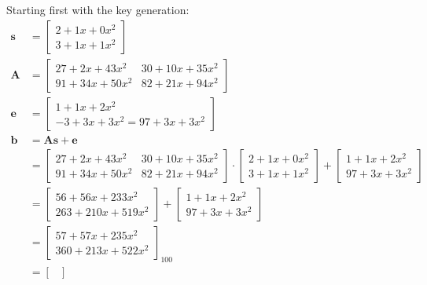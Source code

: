 Starting first with the key generation:
\begin{align*}
  \textbf{s} & = \begin{bmatrix}2+ 1x + 0x^2 \\ 3+1x+1x^2 \end{bmatrix}                                 \\
  \textbf{A} & = \begin{bmatrix}27+2x+43x^2 & 30+10x+35x^2 \\ 91+34x+50x^2 & 82+21x+94x^2 \end{bmatrix} \\
  \textbf{e} & = \begin{bmatrix}1+1x+2x^2 \\ -3+3x+3x^2=97+3x+3x^2 \end{bmatrix}                        \\
  \textbf{b} & = \textbf{A}\textbf{s}+\textbf{e}                                                        \\
             & = \begin{bmatrix}27+2x+43x^2 & 30+10x+35x^2 \\ 91+34x+50x^2 & 82+21x+94x^2 \end{bmatrix}
  \cdot
  \begin{bmatrix}2+ 1x + 0x^2 \\ 3+1x+1x^2 \end{bmatrix}
  +
  \begin{bmatrix}1+1x+2x^2 \\ 97+3x+3x^2 \end{bmatrix}
  \\
             & = 
  \begin{bmatrix}
    56+56x+233x^2 \\
    263+210x+519x^2
  \end{bmatrix}
  + 
  \begin{bmatrix}1+1x+2x^2 \\ 97+3x+3x^2 \end{bmatrix}                                                  \\
             & =   \begin{bmatrix}
                     57+57x+235x^2 \\
                     360+213x+522x^2
                   \end{bmatrix}_{100}                                                                  \\
             & = \begin{bmatrix}

\end{bmatrix}
\end{align*}
